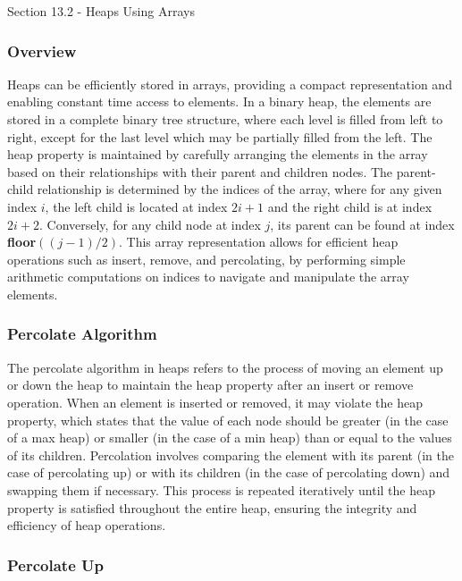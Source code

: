 \begin{notes}{Section 13.2 - Heaps Using Arrays}
    \subsubsection*{Overview}
    
    Heaps can be efficiently stored in arrays, providing a compact representation and enabling constant time access to elements. In a binary heap, the elements are stored in a complete binary tree structure, 
    where each level is filled from left to right, except for the last level which may be partially filled from the left. The heap property is maintained by carefully arranging the elements in the array based 
    on their relationships with their parent and children nodes. The parent-child relationship is determined by the indices of the array, where for any given index $i$, the left child is located at index $2i+1$ 
    and the right child is at index $2i+2$. Conversely, for any child node at index $j$, its parent can be found at index \textbf{floor}$((j-1)/2)$. This array representation allows for efficient heap operations 
    such as insert, remove, and percolating, by performing simple arithmetic computations on indices to navigate and manipulate the array elements.
    
    \subsubsection*{Percolate Algorithm}
    
    The percolate algorithm in heaps refers to the process of moving an element up or down the heap to maintain the heap property after an insert or remove operation. When an element is inserted or removed, it may 
    violate the heap property, which states that the value of each node should be greater (in the case of a max heap) or smaller (in the case of a min heap) than or equal to the values of its children. Percolation 
    involves comparing the element with its parent (in the case of percolating up) or with its children (in the case of percolating down) and swapping them if necessary. This process is repeated iteratively until 
    the heap property is satisfied throughout the entire heap, ensuring the integrity and efficiency of heap operations.
    
    \begin{highlight}
        \subsubsection*{Percolate Up}
    

\end{highlight}
\end{notes}
